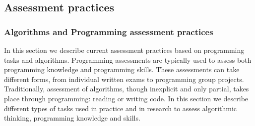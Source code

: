  





\subsection{Assessment practices}



\subsubsection{Algorithms and Programming assessment practices}\label{sec:progAssessPractices}

In this section we describe current assessment practices based on programming tasks and algorithms. Programming assessments are typically used to assess both programming knowledge and programming skills.
These assessments can take different forms, from individual written exams to programming group projects.  Traditionally, assessment of algorithms, though inexplicit and only partial, takes place through programming: reading or writing code. In this section we describe different types of tasks used in practice and in research to assess algorithmic thinking, programming knowledge and skills.







